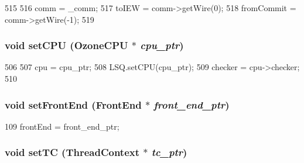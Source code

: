 \begin{DoxyCode}
515 {
516     comm = _comm;
517     toIEW = comm->getWire(0);
518     fromCommit = comm->getWire(-1);
519 }
\end{DoxyCode}
\hypertarget{classLWBackEnd_ab8056057b67b41f234f56940cc115cc1}{
\subsubsection[{setCPU}]{\setlength{\rightskip}{0pt plus 5cm}void setCPU ({\bf OzoneCPU} $\ast$ {\em cpu\_\-ptr})}}
\label{classLWBackEnd_ab8056057b67b41f234f56940cc115cc1}



\begin{DoxyCode}
506 {
507     cpu = cpu_ptr;
508     LSQ.setCPU(cpu_ptr);
509     checker = cpu->checker;
510 }
\end{DoxyCode}
\hypertarget{classLWBackEnd_a122009fa2730cee3898ac945227da8eb}{
\subsubsection[{setFrontEnd}]{\setlength{\rightskip}{0pt plus 5cm}void setFrontEnd ({\bf FrontEnd} $\ast$ {\em front\_\-end\_\-ptr})}}
\label{classLWBackEnd_a122009fa2730cee3898ac945227da8eb}



\begin{DoxyCode}
109     { frontEnd = front_end_ptr; }
\end{DoxyCode}
\hypertarget{classLWBackEnd_ac6ccaaea6ac518cab92f71723b5a739e}{
\subsubsection[{setTC}]{\setlength{\rightskip}{0pt plus 5cm}void setTC ({\bf ThreadContext} $\ast$ {\em tc\_\-ptr})}}
\label{classLWBackEnd_ac6ccaaea6ac518cab92f71723b5a739e}



